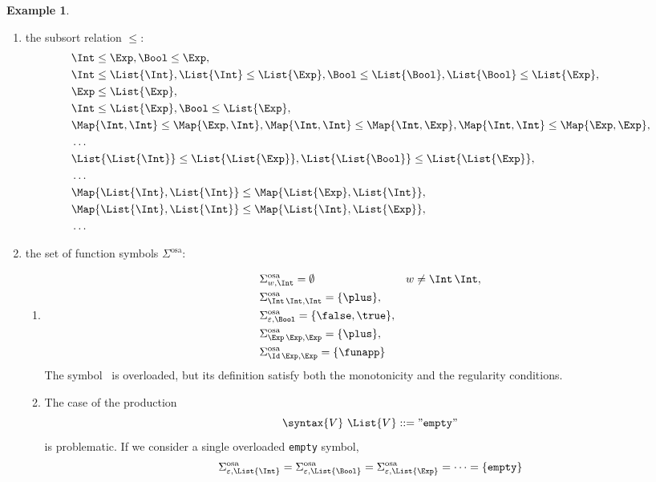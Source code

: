 \documentclass{article}
\theoremstyle{definition}
\newtheorem{example}{Example}[section]
\theoremstyle{definition}
\theoremstyle{definition}
\theoremstyle{definition}
\theoremstyle{definition}
\theoremstyle{theorem}
\theoremstyle{theorem}
\theoremstyle{theorem}
\theoremstyle{theorem}
\theoremstyle{theorem}
\begin{document}
{\begin{example}
\begin{enumerate}
\begin{align*}
&\Map{\List{\Int},\List{\Int}}, \Map{\List{\Int},\List{\Bool}}, \Map{\List{\Int},\List{\Exp}},\\
&\ldots\\
&\Map{\Map{\Int,\Int}, \Map{\Int,\Int}}, \Map{\Map{\Int,\Int},\Map{\Int,\Bool}},\\ 
&\ldots
\end{align*}
\item the subsort relation $\le$:
\begin{align*}
&\Int\le \Exp, \Bool\le \Exp,\\
&\Int\le \List{\Int}, \List{\Int}\le \List{\Exp}, \Bool\le\List{\Bool}, \List{\Bool}\le \List{\Exp},\\ &\Exp\le\List{\Exp},\\
&\Int\le \List{\Exp},  \Bool\le\List{\Exp},\\
&\Map{\Int,\Int}\le \Map{\Exp,\Int}, \Map{\Int,\Int}\le \Map{\Int,\Exp}, \Map{\Int,\Int}\le \Map{\Exp,\Exp},\\
&\ldots\\
&\List{\List{\Int}}\le\List{\List{\Exp}}, \List{\List{\Bool}}\le \List{\List{\Exp}},\\
&\ldots\\
&\Map{\List{\Int},\List{\Int}}\le \Map{\List{\Exp},\List{\Int}}, \\
&\Map{\List{\Int},\List{\Int}}\le \Map{\List{\Int},\List{\Exp}},\\
&\ldots
\end{align*}
\item the set of function symbols $\Sigma^\textrm{osa}$:
\begin{enumerate}
\item
\begin{align*}
&\Sigma^\textrm{osa}_{w,\Int}=\emptyset &&w\not=\Int\,\Int,\\
&\Sigma^\textrm{osa}_{\Int\,\Int,\Int}=\{\plus\},\\
&\Sigma^\textrm{osa}_{\varepsilon,\Bool}=\{\false,\true\},\\
&\Sigma^\textrm{osa}_{\Exp\,\Exp,\Exp} = \{\plus\},\\
&\Sigma^\textrm{osa}_{\Id\,\Exp,\Exp} = \{\funapp\}
\end{align*}
The symbol \plus\ is overloaded, but its definition satisfy both the monotonicity and the regularity conditions. 
\item
The case of the production
\[
\syntax\{V\}\ \List{V} ::= "\texttt{empty}"
\]
is problematic. If we consider a single overloaded \texttt{empty} symbol,
\[
\Sigma^\textrm{osa}_{\varepsilon,\List{\Int}}=\Sigma^\textrm{osa}_{\varepsilon,\List{\Bool}}=\Sigma^\textrm{osa}_{\varepsilon,\List{\Exp}}=\cdots=\{\texttt{empty}\}
\]
\end{enumerate}
\end{enumerate}
\end{example}}
\end{document}
